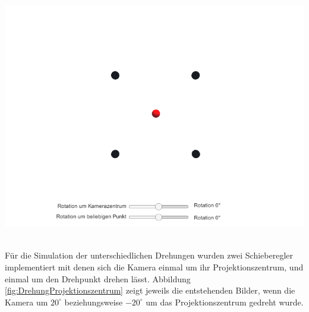 \begin{minipage}{\linewidth}
	\centering
	\includegraphics[width=.8\linewidth]{images/Ausgangslage.png}
	\label{fig:SimulationAnfang}
\end{minipage}\\

%
%
%

Für die Simulation der unterschiedlichen Drehungen wurden zwei Schieberegler implementiert mit denen sich die Kamera einmal um ihr Projektionszentrum, und einmal um den Drehpunkt drehen lässt. Abbildung \ref{fig:DrehungProjektionszentrum} zeigt jeweils die entstehenden Bilder, wenn die Kamera um \ensuremath{20^\circ} beziehungsweise \ensuremath{-20^\circ} um das Projektionszentrum gedreht wurde.



